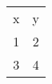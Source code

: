 \begin{table}[h]
\centering
\begin{tabular}{c c}
x & y \\
1 & 2 \\
3 & 4 \\
\end{tabular}
\end{table}